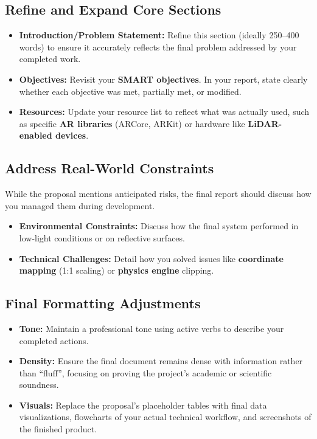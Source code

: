 \documentclass[twoside,12pt,openright]{report}
\begin{document}
\subsection{Refine and Expand Core Sections}

\begin{itemize}
  \item \textbf{Introduction/Problem Statement:} Refine this section (ideally
    250--400 words) to ensure it accurately reflects the final problem addressed
    by your completed work.
  \item \textbf{Objectives:} Revisit your \textbf{SMART objectives}. In your
    report, state clearly whether each objective was met, partially met, or
    modified.
  \item \textbf{Resources:} Update your resource list to reflect what was
    actually used, such as specific \textbf{AR libraries} (ARCore, ARKit) or
    hardware like \textbf{LiDAR-enabled devices}.
\end{itemize}

\subsection{Address Real-World Constraints}

While the proposal mentions anticipated risks, the final report should discuss
how you managed them during development.

\begin{itemize}
  \item \textbf{Environmental Constraints:} Discuss how the final system
    performed in low-light conditions or on reflective surfaces.
  \item \textbf{Technical Challenges:} Detail how you solved issues like
    \textbf{coordinate mapping} (1:1 scaling) or \textbf{physics engine}
    clipping.
\end{itemize}

\subsection{Final Formatting Adjustments}

\begin{itemize}
  \item \textbf{Tone:} Maintain a professional tone using active verbs to
    describe your completed actions.
  \item \textbf{Density:} Ensure the final document remains dense with
    information rather than ``fluff'', focusing on proving the project's
    academic or scientific soundness.
  \item \textbf{Visuals:} Replace the proposal's placeholder tables with final
    data visualizations, flowcharts of your actual technical workflow, and
    screenshots of the finished product.
\end{itemize}
\end{document}

